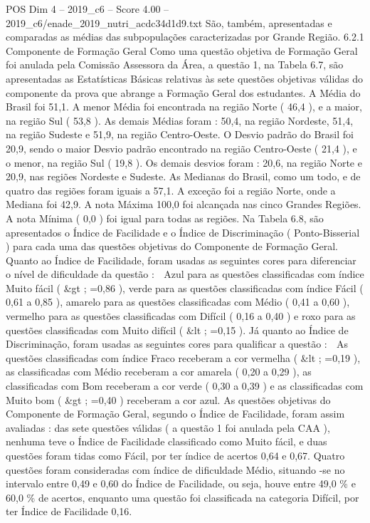 \begin{textsample}{POS Dim 4 – 2019\_c6 – Score 4.00 – 2019\_c6/enade\_2019\_nutri\_acdc34d1d9.txt}
São, também, apresentadas e comparadas as médias das subpopulações caracterizadas por Grande Região. 6.2.1 Componente de Formação Geral Como uma questão objetiva de Formação Geral foi anulada pela Comissão Assessora da Área, a questão 1, na Tabela 6.7, são apresentadas as Estatísticas Básicas relativas às sete questões objetivas válidas do componente da prova que abrange a Formação Geral dos estudantes.
A Média do Brasil foi 51,1.
A menor Média foi encontrada na região Norte ( 46,4 ), e a maior, na região Sul ( 53,8 ).
As demais Médias foram : 50,4, na região Nordeste, 51,4, na região Sudeste e 51,9, na região Centro-Oeste.
O Desvio padrão do Brasil foi 20,9, sendo o maior Desvio padrão encontrado na região Centro-Oeste ( 21,4 ), e o menor, na região Sul ( 19,8 ).
Os demais desvios foram : 20,6, na região Norte e 20,9, nas regiões Nordeste e Sudeste.
As Medianas do Brasil, como um todo, e de quatro das regiões foram iguais a 57,1.
A exceção foi a região Norte, onde a Mediana foi 42,9.
A nota Máxima 100,0 foi alcançada nas cinco Grandes Regiões.
A nota Mínima ( 0,0 ) foi igual para todas as regiões.
Na Tabela 6.8, são apresentados o Índice de Facilidade e o Índice de Discriminação ( Ponto-Bisserial ) para cada uma das questões objetivas do Componente de Formação Geral.
Quanto ao Índice de Facilidade, foram usadas as seguintes cores para diferenciar o nível de dificuldade da questão :  Azul para as questões classificadas com índice Muito fácil ( \&gt ; =0,86 ), verde para as questões classificadas com índice Fácil ( 0,61 a 0,85 ), amarelo para as questões classificadas com Médio ( 0,41 a 0,60 ), vermelho para as questões classificadas com Difícil ( 0,16 a 0,40 ) e roxo para as questões classificadas com Muito difícil ( \&lt ; =0,15 ).
Já quanto ao Índice de Discriminação, foram usadas as seguintes cores para qualificar a questão :  As questões classificadas com índice Fraco receberam a cor vermelha ( \&lt ; =0,19 ), as classificadas com Médio receberam a cor amarela ( 0,20 a 0,29 ), as classificadas com Bom receberam a cor verde ( 0,30 a 0,39 ) e as classificadas com Muito bom ( \&gt ; =0,40 ) receberam a cor azul.
As questões objetivas do Componente de Formação Geral, segundo o Índice de Facilidade, foram assim avaliadas : das sete questões válidas ( a questão 1 foi anulada pela CAA ), nenhuma teve o Índice de Facilidade classificado como Muito fácil, e duas questões foram tidas como Fácil, por ter índice de acertos 0,64 e 0,67.
Quatro questões foram consideradas com índice de dificuldade Médio, situando -se no intervalo entre 0,49 e 0,60 do Índice de Facilidade, ou seja, houve entre 49,0 \% e 60,0 \% de acertos, enquanto uma questão foi classificada na categoria Difícil, por ter Índice de Facilidade 0,16.

\end{textsample}
